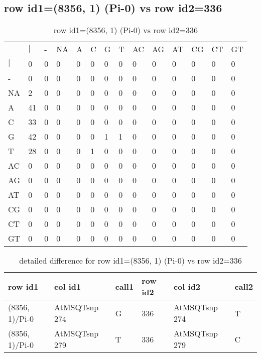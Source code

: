 \subsection{row id1=(8356, 1) (Pi-0) vs row id2=336}
\begin{center}
\begin{longtable}{|l|l|l|l|l|l|l|l|l|l|l|l|l|l|}
\caption{row id1=(8356, 1) (Pi-0) vs row id2=336} \label{table_dm572}\\
\hline
\\
\hline
&$|$&-&NA&A&C&G&T&AC&AG&AT&CG&CT&GT\\
$|$&0&0&0&0&0&0&0&0&0&0&0&0&0\\
-&0&0&0&0&0&0&0&0&0&0&0&0&0\\
NA&2&0&0&0&0&0&0&0&0&0&0&0&0\\
A&41&0&0&0&0&0&0&0&0&0&0&0&0\\
C&33&0&0&0&0&0&0&0&0&0&0&0&0\\
G&42&0&0&0&0&1&1&0&0&0&0&0&0\\
T&28&0&0&0&1&0&0&0&0&0&0&0&0\\
AC&0&0&0&0&0&0&0&0&0&0&0&0&0\\
AG&0&0&0&0&0&0&0&0&0&0&0&0&0\\
AT&0&0&0&0&0&0&0&0&0&0&0&0&0\\
CG&0&0&0&0&0&0&0&0&0&0&0&0&0\\
CT&0&0&0&0&0&0&0&0&0&0&0&0&0\\
GT&0&0&0&0&0&0&0&0&0&0&0&0&0\\
\hline
\end{longtable}
\end{center}

\begin{center}
\begin{longtable}{|l|l|l|l|l|l|}
\caption{detailed difference for row id1=(8356, 1) (Pi-0) vs row id2=336} \label{table_dm573}\\
\hline
row id1&col id1&call1&row id2&col id2&call2\\
\hline
(8356, 1)/Pi-0&AtMSQTsnp 274&G&336&AtMSQTsnp 274&T\\
(8356, 1)/Pi-0&AtMSQTsnp 279&T&336&AtMSQTsnp 279&C\\
\hline
\end{longtable}
\end{center}

